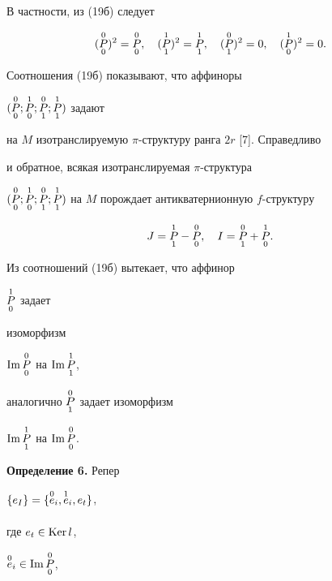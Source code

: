 В частности, из (19б) следует


$$


(\updown{0}{0}{P})^2=\updown{0}{0}{P},\quad


(\updown{1}{1}{P})^2=\updown{1}{1}{P},\quad


(\updown{0}{1}{P})^2=0,\quad


(\updown{1}{0}{P})^2=0.


$$


Соотношения (19б) показывают, что аффиноры


$(\updown{0}{0}{P};\updown{1}{0}{P};\updown{0}{1}{P};


\updown{1}{1}{P})$ задают


на $M$ изотранслируемую $\pi$-структуру ранга $2r$ [7]. Справедливо


и обратное, всякая изотранслируемая $\pi$-структура


$(\updown{0}{0}{P};\updown{1}{0}{P};\updown{0}{1}{P};


\updown{1}{1}{P})$ на $M$ порождает антикватернионную $f$-структуру


\begin{equation}


J=\updown{1}{1}{P}-\updown{0}{0}{P},\quad


I=\updown{0}{1}{P}+\updown{1}{0}{P}.


\end{equation}





\begin{notenonum} Из соотношений (19б) вытекает, что аффинор


$\overset{1}{\underset{0}{P}}{}$ задает


изоморфизм


$\operatorname{Im}\overset{0}{\underset{0}{P}}{}$ на $\operatorname{Im}\overset{1}{\underset{1}{P}}{}$,


аналогично $\overset{0}{\underset{1}{P}}{}$ задает изоморфизм


$\operatorname{Im}\overset{1}{\underset{1}{P}}{}$ на $\operatorname{Im}\overset{0}{\underset{0}{P}}{}$.


\end{notenonum}





{\bf Определение 6.} Репер


$\{e_I\}=\{\overset{0}{\underset{}{e}}{}_i,\overset{1}{\underset{}{e}}{}_i,e_t\}$,


где $e_t\in\operatorname{Ker} l$,


$\overset{0}{\underset{}{e}}{}_i\in\operatorname{Im}\overset{0}{\underset{0}{P}}{}$,


